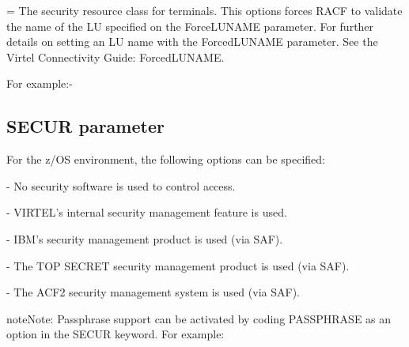 \documentclass[letterpaper,10pt,english]{sphinxmanual}
\begin{document}
 = The security resource class for terminals. This options forces RACF to validate the name of the LU specified on the ForceLUNAME parameter. For further details on setting an LU name with the ForcedLUNAME parameter. See the Virtel Connectivity Guide: ForcedLUNAME.

For example:-

\begin{sphinxVerbatim}[commandchars=\\\{\}]
\end{sphinxVerbatim}


\subsection{SECUR parameter}
\label{\detokenize{Installation_Guide:secur-parameter}}\label{\detokenize{Installation_Guide:index-111}}
\begin{sphinxVerbatim}[commandchars=\\\{\}]
 
\end{sphinxVerbatim}

For the z/OS environment, the following options can be specified:

 - No security software is used to control access.

 - VIRTEL’s internal security management feature is used.

 - IBM’s security management product is used (via SAF).

 - The TOP SECRET security management product is used (via SAF).

 - The ACF2 security management system is used (via SAF).

\begin{sphinxadmonition}{note}{Note:}
Passphrase support can be activated by coding PASSPHRASE as an option in the SECUR keyword. For example: 
\end{sphinxadmonition}
\end{document}
